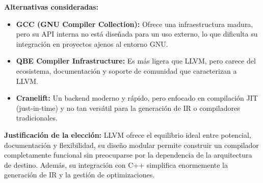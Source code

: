 \textbf{Alternativas consideradas:}
\begin{itemize}
    \item \textbf{GCC (GNU Compiler Collection):} Ofrece una infraestructura madura, pero su API interna no está diseñada para un uso externo, lo que dificulta su integración en proyectos ajenos al entorno GNU.
    \item \textbf{QBE Compiler Infrastructure:} Es más ligera que LLVM, pero carece del ecosistema, documentación y soporte de comunidad que caracterizan a LLVM.
    \item \textbf{Cranelift:} Un backend moderno y rápido, pero enfocado en compilación JIT (just-in-time) y no tan versátil para la generación de IR o compiladores tradicionales.
\end{itemize}

\textbf{Justificación de la elección:}  
LLVM ofrece el equilibrio ideal entre potencial, documentación y flexibilidad, su diseño modular permite construir un compilador completamente funcional sin preocuparse por la dependencia de la arquitectura de destino. Además, su integración con C++ simplifica enormemente la generación de IR y la gestión de optimizaciones.